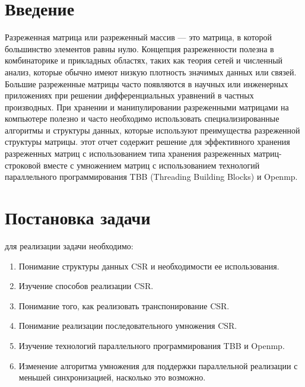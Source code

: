 \documentclass{report}
\begin{document}
\setcounter{page}{2}

\tableofcontents
\newpage

\section*{Введение}
Разреженная матрица или разреженный массив — это матрица, в которой большинство элементов равны нулю. Концепция разреженности полезна в комбинаторике и прикладных областях, таких как теория сетей и численный анализ, которые обычно имеют низкую плотность значимых данных или связей. Большие разреженные матрицы часто появляются в научных или инженерных приложениях при решении дифференциальных уравнений в частных производных. При хранении и манипулировании разреженными матрицами на компьютере полезно и часто необходимо использовать специализированные алгоритмы и структуры данных, которые используют преимущества разреженной структуры матрицы. этот отчет содержит решение для эффективного хранения разреженных матриц с использованием типа хранения разреженных матриц-строковой вместе с умножением матриц с использованием технологий параллельного программирования TBB (Threading Building Blocks) и Openmp.

\section*{Постановка задачи}
для реализации задачи необходимо:
\begin{enumerate}
\item Понимание структуры данных CSR и необходимости ее использования.
\item Изучение способов реализации CSR.
\item Понимание того, как реализовать транспонирование CSR.
\item Понимание реализации последовательного умножения CSR.
\item Изучение технологий параллельного программирования TBB и Openmp.
\item Изменение алгоритма умножения для поддержки параллельной реализации с меньшей синхронизацией, насколько это возможно.
\end{enumerate}

\newpage

\end{document}
